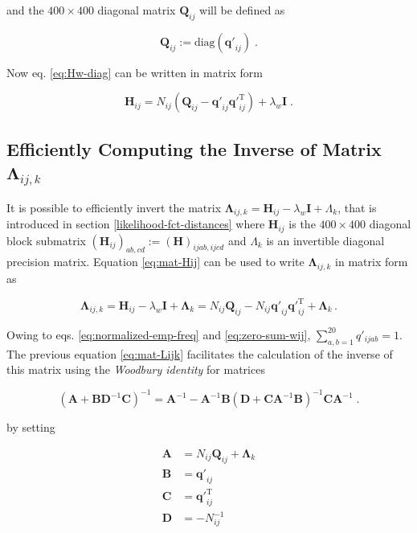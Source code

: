 \documentclass[11pt,a4paper,twoside]{book}
\renewcommand{\H}{\mathbf{H}}
\newcommand{\I}{\mathbf{I}}
\newcommand{\Lijk}{\mathbf{\Lambda}_{ij,k}}
\newcommand{\Lk}{\mathbf{\Lambda}_k}
\newcommand{\Qij}{\mathbf{Q}_{ij}}
\newcommand{\qij}{\mathbf{q\prime}_{ij}}
\theoremstyle{definition}
\theoremstyle{definition}
\theoremstyle{remark}
\begin{document}
and the \(400 \times 400\) diagonal matrix \(\Qij\) will be defined as

\begin{equation}
    \Qij := \text{diag}(\qij) \; .
\end{equation}

Now eq. \eqref{eq:Hw-diag} can be written in matrix form

\begin{equation}
     \H_{ij} = N_{ij} \left( \Qij -  \qij \qij^{\mathrm{T}} \right)  + \lambda_w \I \; .
\label{eq:mat-Hij}
\end{equation}

\subsection{\texorpdfstring{Efficiently Computing the Inverse of Matrix
\(\Lijk\)}{Efficiently Computing the Inverse of Matrix \textbackslash{}Lijk}}\label{inv-lambda-ij-k}

It is possible to efficiently invert the matrix
\(\Lijk = \H_{ij} - \lambda_w \I + \Lambda_k\), that is introduced in
section \ref{likelihood-fct-distances} where \(\H_{ij}\) is the
\(400 \times 400\) diagonal block submatrix
\((\H_{ij})_{ab,cd} := (\H)_{ijab,ijcd}\) and \(\Lambda_k\) is an
invertible diagonal precision matrix. Equation \eqref{eq:mat-Hij} can be
used to write \(\Lijk\) in matrix form as

\begin{equation}
     \Lijk = \H_{ij} - \lambda_w \I + \Lk = N_{ij} \Qij- N_{ij} \qij \qij^{\mathrm{T}} + \Lk \,.
\label{eq:mat-Lijk}
\end{equation}

Owing to eqs. \eqref{eq:normalized-emp-freq} and \eqref{eq:zero-sum-wij},
\(\sum_{a,b=1}^{20} q'_{ijab} = 1\). The previous equation
\eqref{eq:mat-Lijk} facilitates the calculation of the inverse of this
matrix using the \emph{Woodbury identity} for matrices

\begin{equation}
    (\mathbf{A} + \mathbf{B} \mathbf{D}^{-1} \mathbf{C})^{-1} = \mathbf{A}^{-1} - \mathbf{A}^{-1} \mathbf{B} (\mathbf{D} + \mathbf{C} \mathbf{A}^{-1} \mathbf{B}) ^{-1} \mathbf{C} \mathbf{A}^{-1} \;. 
\end{equation}

by setting

\begin{align}
  \mathbf{A} &= N_{ij} \Qij + \Lk \nonumber\\
  \mathbf{B} &= \qij \nonumber\\
  \mathbf{C} &= \qij^\mathrm{T} \nonumber\\
  \mathbf{D} &=- N_{ij}^{-1} \nonumber
\end{align}
\end{document}
